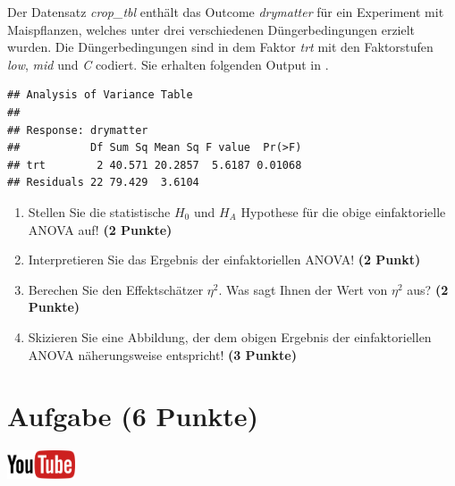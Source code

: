 \documentclass[a4paper, 10pt]{scrartcl}\usepackage[]{graphicx}\usepackage[]{xcolor}
\makeatletter
\newenvironment{kframe}{%
 \def\at@end@of@kframe{}%
 \ifinner\ifhmode%
  \def\at@end@of@kframe{\end{minipage}}%
  \begin{minipage}{\columnwidth}%
 \fi\fi%
 \def\FrameCommand##1{\hskip\@totalleftmargin \hskip-\fboxsep
 \colorbox{shadecolor}{##1}\hskip-\fboxsep
     \hskip-\linewidth \hskip-\@totalleftmargin \hskip\columnwidth}%
 \MakeFramed {\advance\hsize-\width
   \@totalleftmargin\z@ \linewidth\hsize
   \@setminipage}}%
 {\par\unskip\endMakeFramed%
 \at@end@of@kframe}
\newenvironment{knitrout}{}{} %
\makeatother
\begin{document}
Der Datensatz \textit{crop\_tbl} enth{\"a}lt das Outcome \textit{drymatter} f{\"u}r ein Experiment mit 
Maispflanzen, welches unter drei 
verschiedenen D{\"u}ngerbedingungen erzielt wurden. Die D{\"u}ngerbedingungen sind in dem Faktor
\textit{trt} mit den Faktorstufen \textit{low},  \textit{mid} und
 \textit{C} codiert. Sie erhalten folgenden Output in \Rlogo.

\begin{knitrout}
\color{fgcolor}\begin{kframe}
\begin{verbatim}
## Analysis of Variance Table
## 
## Response: drymatter
##           Df Sum Sq Mean Sq F value  Pr(>F)
## trt        2 40.571 20.2857  5.6187 0.01068
## Residuals 22 79.429  3.6104
\end{verbatim}
\end{kframe}
\end{knitrout}

\begin{enumerate}
\item Stellen Sie die statistische $H_0$ und $H_A$ Hypothese f{\"u}r die obige
  einfaktorielle ANOVA auf! \textbf{(2 Punkte)}
\item Interpretieren Sie das Ergebnis der einfaktoriellen ANOVA! \textbf{(2 Punkt)} 
\item Berechen Sie den Effektsch{\"a}tzer $\eta^2$. Was sagt Ihnen der Wert von
  $\eta^2$ aus? \textbf{(2 Punkte)}
\item Skizieren Sie eine Abbildung, der dem obigen Ergebnis der
  einfaktoriellen ANOVA n{\"a}herungsweise entspricht! \textbf{(3 Punkte)}
\end{enumerate}

 
\clearpage

\section{Aufgabe \hfill (6 Punkte)}

\hfill\href{https://youtu.be/zDK2dhgtFt0}{\includegraphics[width =
  2cm]{img/youtube}}\\[1Ex]
\end{document}

